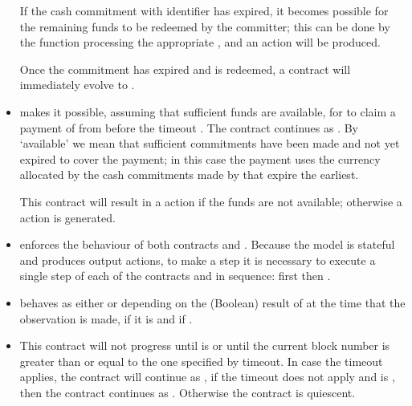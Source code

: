 \documentclass[
      acmsmall
    , screen
    , review=true
  ]{acmart}
\begin{document}
\begin{itemize}
If the cash commitment with identifier  has expired, it becomes possible for the remaining funds to be redeemed by the committer; this can be done by the  function processing the appropriate , and an  action will be produced. 

Once the commitment  has expired and is redeemed, a  contract will immediately evolve to .

\item {} makes it possible, assuming that sufficient funds are available, for 
 to claim  a payment of  from  before the timeout 
. The contract continues as . By `available' we mean that sufficient commitments have 
been made and  not yet expired to cover the payment; in this case the payment  uses the currency allocated by the cash 
commitments made by  that expire the earliest.

 This contract will result in a  action if the funds are not available; otherwise a  action is generated.

\item {} enforces the behaviour of both contracts  and . Because the model is stateful and produces output actions, to make a step it is necessary to execute a single step of each of  the contracts  and  in sequence: first  then .

\item {} behaves as either  or  depending on the (Boolean) result of  at the time that the observation is made,  if it is  and  if .

\item {} This contract will not progress until  is  or until the current block number is greater than or equal to the one specified by timeout. In case the timeout applies, the contract will continue as , if the timeout does not apply and  is , then the contract continues as . Otherwise the contract is quiescent.
\end{itemize}
\end{document}
